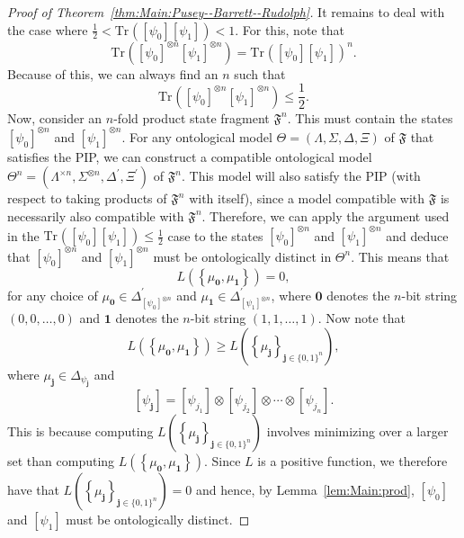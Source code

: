 \documentclass[DIV=calc,fontsize=12pt]{scrartcl} %
\theoremstyle{definition}
\theoremstyle{plain}
\newcommand{\Proj}[1]{\ensuremath{\left [ #1 \right ]}}
\newcommand{\Tr}[2][]{\ensuremath{\text{Tr}_{#1} \left ( #2 \right )}}
\begin{document}
\begin{proof}[Proof of Theorem~\ref{thm:Main:Pusey--Barrett--Rudolph}]
It remains to deal with the case where $\frac{1}{2}<\Tr{\Proj{\psi_0}\Proj{\psi_1}}<1$. For this, note that
\begin{equation}
\Tr{\Proj{\psi_0}^{\otimes n} \Proj{\psi_1}^{\otimes n}} =
\Tr{\Proj{\psi_0} \Proj{\psi_1}}^n.
\end{equation}
Because of this, we can always find an $n$ such that
\begin{equation}
\Tr{\Proj{\psi_0}^{\otimes n} \Proj{\psi_1}^{\otimes n}} \leq
\frac{1}{2}.
\end{equation}
Now, consider an $n$-fold product state fragment $\mathfrak{F}^n$.
This must contain the states $\Proj{\psi_0}^{\otimes n}$ and
$\Proj{\psi_1}^{\otimes n}$.  For any ontological model $\Theta =
(\Lambda, \Sigma, \Delta, \Xi)$ of $\mathfrak{F}$ that satisfies the
PIP, we can construct a compatible ontological model $\Theta^n =
(\Lambda^{\times n}, \Sigma^{\otimes n}, \Delta^{\prime},
\Xi^{\prime})$ of $\mathfrak{F}^n$.  This model will also satisfy
the PIP (with respect to taking products of $\mathfrak{F}^n$ with
itself), since a model compatible with $\mathfrak{F}$ is necessarily
also compatible with $\mathfrak{F}^n$.  Therefore, we can apply the
argument used in the $\Tr{\Proj{\psi_0}\Proj{\psi_1}} \leq
\frac{1}{2}$ case to the states $\Proj{\psi_0}^{\otimes n}$ and
$\Proj{\psi_1}^{\otimes n}$ and deduce that $\Proj{\psi_0}^{\otimes
n}$ and $\Proj{\psi_1}^{\otimes n}$ must be ontologically distinct
in $\Theta^n$.  This means that
\begin{equation}
L \left ( \left \{ \mu_{\bm{0}}, \mu_{\bm{1}} \right \}
\right ) = 0,
\end{equation}
for any choice of $\mu_{\bm{0}} \in
\Delta^{\prime}_{\Proj{\psi_0}^{\otimes n}}$ and $\mu_{\bm{1}} \in
\Delta^{\prime}_{\Proj{\psi_1}^{\otimes n}}$, where $\bm{0}$ denotes
the $n$-bit string $(0,0,\ldots,0)$ and $\bm{1}$ denotes the $n$-bit
string $(1,1,\ldots,1)$.  Now note that
\begin{equation}
L \left ( \left \{ \mu_{\bm{0}}, \mu_{\bm{1}} \right \} \right )
\geq L \left ( \left \{ \mu_{\bm{j}}\right \}_{\bm{j} \in
\{0,1\}^n}\right ),
\end{equation}
where $\mu_{\bm{j}} \in \Delta_{\psi_{\bm{j}}}$ and
\begin{equation}
\Proj{\psi_{\bm{j}}} = \Proj{\psi_{j_1}} \otimes
\Proj{\psi_{j_2}} \otimes \cdots \otimes \Proj{\psi_{j_n}}.
\end{equation}
This is because computing $L \left ( \left \{ \mu_{\bm{j}}\right
\}_{\bm{j} \in \{0,1\}^n}\right )$ involves minimizing over a
larger set than computing $ L \left ( \left \{ \mu_{\bm{0}},
\mu_{\bm{1}} \right \} \right )$.  Since $L$ is a positive
function, we therefore have that $L \left ( \left \{
\mu_{\bm{j}}\right \}_{\bm{j} \in \{0,1\}^n}\right ) = 0$ and
hence, by Lemma~\ref{lem:Main:prod}, $\Proj{\psi_0}$ and
$\Proj{\psi_1}$ must be ontologically distinct.
\end{proof}
\end{document}
